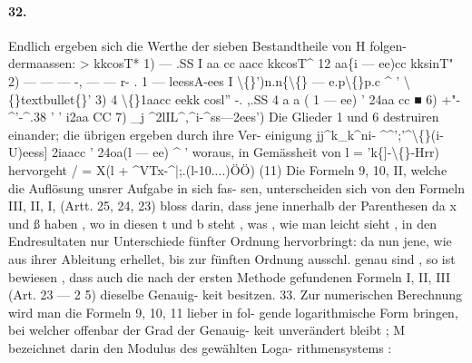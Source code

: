 \documentclass[12pt,a4paper]{article}
\begin{document}
\paragraph{32.}
Endlich  ergeben  sich  die  Werthe  der  sieben  Bestandtheile  von    H  folgen- dermaassen: >  kkcosT* 1)   --- .SS I  aa  cc aacc kkcosT\^{} 12  aa\{i  ---  ee)cc kksinT" 2)     --- --- --- -, --- --- r- .  1 --- leessA-ees I  \textbackslash\{\}')n.n\{\textbackslash\{\}  ---  e.p\textbackslash\{\}p.c     \^{}  '  \textbackslash\{\}textbullet\{\}' 3) 4 \textbackslash\{\}1aacc eekk  cosl'' -.  ,.SS 4  a  a  ( 1  ---  ee) '  24aa  cc ■         6)       +"-\^{}'-\^{}.38 '  '      i2aa  CC 7)     \_j  \^{}2lIL\^{},\^{}i-\^{}ss---2ees') Die  Glieder   1   und  6  destruiren  einander;  die  übrigen  ergeben  durch  ihre  Ver- einigung jj\^{}k\_k\^{}ni-  \^{}\^{}';'\^{}\textbackslash\{\}(i-U)eess] 2iaacc  '  24oa(l  --- ee)    \^{}  ' woraus,  in  Gemässheit  von    l  = 'k\{]-\textbackslash\{\}-Hrr)    hervorgeht /  =  X(l  +  \^{}VTx-\^{}|;.(l-10....)ÖÖ) (11) Die  Formeln  9,  10,  II,  welche  die  Auflösung  unsrer  Aufgabe  in  sich  fas- sen, unterscheiden  sich  von  den  Formeln  III,  II,  I,  (Artt.  25,  24,  23)  bloss  darin, dass  jene  innerhalb  der  Parenthesen  da  x  und  ß  haben ,  wo  in  diesen  t  und  b steht ,  was ,  wie  man  leicht  sieht ,  in  den  Endresultaten  nur  Unterschiede  fünfter Ordnung  hervorbringt:  da  nun  jene,  wie  aus  ihrer  Ableitung  erhellet,  bis  zur fünften  Ordnung  ausschl.  genau  sind ,  so  ist  bewiesen ,  dass  auch  die  nach  der ersten  Methode  gefundenen  Formeln  I,  II,  III  (Art.  23  ---  2  5)  dieselbe  Genauig- keit besitzen. 33. Zur  numerischen  Berechnung  wird  man  die  Formeln  9,  10,  11  lieber  in  fol- gende logarithmische  Form  bringen,  bei  welcher  offenbar  der  Grad  der  Genauig- keit unverändert  bleibt ;  M  bezeichnet  darin  den  Modulus  des  gewählten  Loga- rithmensystems :
\end{document}
